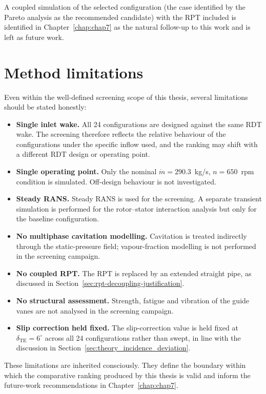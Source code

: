 A coupled simulation of the selected configuration (the case identified by the Pareto analysis as the recommended candidate) with the RPT included is identified in Chapter~\ref{chap:chap7} as the natural follow-up to this work and is left as future work.
 
\section{Method limitations}
\label{sec:methods_limitations_master}
 
Even within the well-defined screening scope of this thesis, several limitations should be stated honestly:
\begin{itemize}
  \item \textbf{Single inlet wake.} All 24 configurations are designed against the same RDT wake. The screening therefore reflects the relative behaviour of the configurations under the specific inflow used, and the ranking may shift with a different RDT design or operating point.
  \item \textbf{Single operating point.} Only the nominal $\dot m = 290.3$~kg/s, $n = 650$~rpm condition is simulated. Off-design behaviour is not investigated.
  \item \textbf{Steady RANS.} Steady RANS is used for the screening. A separate transient simulation is performed for the rotor--stator interaction analysis but only for the baseline configuration.
  \item \textbf{No multiphase cavitation modelling.} Cavitation is treated indirectly through the static-pressure field; vapour-fraction modelling is not performed in the screening campaign.
  \item \textbf{No coupled RPT.} The RPT is replaced by an extended straight pipe, as discussed in Section~\ref{sec:rpt-decoupling-justification}.
  \item \textbf{No structural assessment.} Strength, fatigue and vibration of the guide vanes are not analysed in the screening campaign.
  \item \textbf{Slip correction held fixed.} The slip-correction value is held fixed at $\delta_{\mathrm{TE}} = 6^\circ$ across all 24 configurations rather than swept, in line with the discussion in Section~\ref{sec:theory_incidence_deviation}.
\end{itemize}
 
These limitations are inherited consciously. They define the boundary within which the comparative ranking produced by this thesis is valid and inform the future-work recommendations in Chapter~\ref{chap:chap7}.


